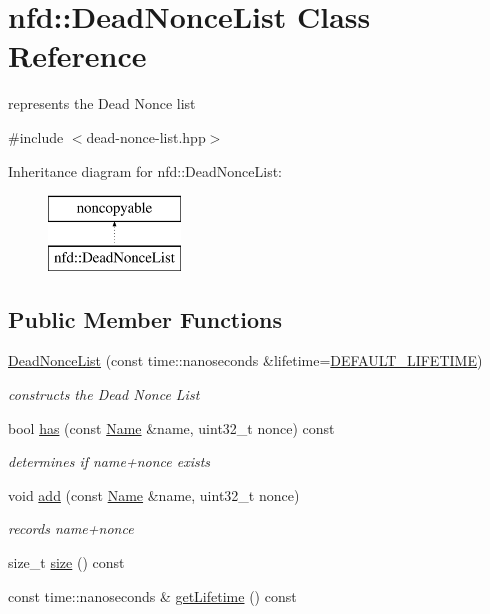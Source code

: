 \hypertarget{classnfd_1_1DeadNonceList}{}\section{nfd\+:\+:Dead\+Nonce\+List Class Reference}
\label{classnfd_1_1DeadNonceList}


represents the Dead Nonce list  




{\ttfamily \#include $<$dead-\/nonce-\/list.\+hpp$>$}

Inheritance diagram for nfd\+:\+:Dead\+Nonce\+List\+:\begin{figure}[H]
\begin{center}
\leavevmode
\includegraphics[height=2.000000cm]{classnfd_1_1DeadNonceList}
\end{center}
\end{figure}
\subsection*{Public Member Functions}
\begin{DoxyCompactItemize}
\item 
\hyperlink{classnfd_1_1DeadNonceList_a9bb957fb8255097b73106f4c25298086}{Dead\+Nonce\+List} (const time\+::nanoseconds \&lifetime=\hyperlink{classnfd_1_1DeadNonceList_a920d3d1b46f04b27cb162b12c482a3fc}{D\+E\+F\+A\+U\+L\+T\+\_\+\+L\+I\+F\+E\+T\+I\+ME})
\begin{DoxyCompactList}\small\item\em constructs the Dead Nonce List \end{DoxyCompactList}\item 
bool \hyperlink{classnfd_1_1DeadNonceList_a72d5cc819a5424be2ebf3320ef450113}{has} (const \hyperlink{classndn_1_1Name}{Name} \&name, uint32\+\_\+t nonce) const
\begin{DoxyCompactList}\small\item\em determines if name+nonce exists \end{DoxyCompactList}\item 
void \hyperlink{classnfd_1_1DeadNonceList_aa4e1ae3a3078544fe1d28fac037c2d6e}{add} (const \hyperlink{classndn_1_1Name}{Name} \&name, uint32\+\_\+t nonce)\hypertarget{classnfd_1_1DeadNonceList_aa4e1ae3a3078544fe1d28fac037c2d6e}{}\label{classnfd_1_1DeadNonceList_aa4e1ae3a3078544fe1d28fac037c2d6e}

\begin{DoxyCompactList}\small\item\em records name+nonce \end{DoxyCompactList}\item 
size\+\_\+t \hyperlink{classnfd_1_1DeadNonceList_a7ae6e2e76d15154c40e51122eb6f7145}{size} () const
\item 
const time\+::nanoseconds \& \hyperlink{classnfd_1_1DeadNonceList_a967388241d9be15f0a194b7be2727490}{get\+Lifetime} () const
\end{DoxyCompactItemize}
